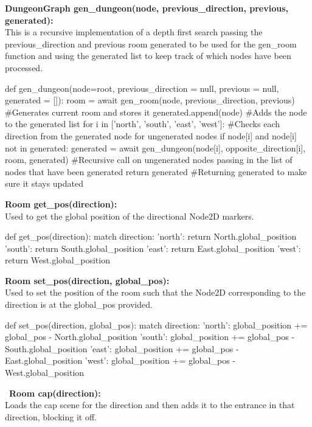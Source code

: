 \documentclass{article}
\begin{document}
        \textbf{DungeonGraph gen\_dungeon(node, previous\_direction, previous, generated):}\\
        This is a recursive implementation of a depth first search passing the previous\_direction and previous room generated to be used for the gen\_room function and using the generated list to keep track of which nodes have been processed.\\
        \begin{python}
def gen_dungeon(node=root, previous_direction = null, previous = null, generated = []):
   room = await gen_room(node, previous_direction, previous) #Generates current room and stores it
   generated.append(node) #Adds the node to the generated list
   for i in ['north', 'south', 'east', 'west']: #Checks each direction from the generated node for ungenerated nodes
      if node[i] and node[i] not in generated:
         generated = await gen_dungeon(node[i], opposite_direction[i], room, generated) #Recursive call on ungenerated nodes passing in the list of nodes that have been generated
   return generated #Returning generated to make sure it stays updated
        \end{python}
        \textbf{Room get\_pos(direction):}\\
        Used to get the global position of the directional Node2D markers.
        \begin{python}
def get_pos(direction):
   match direction:
      'north':
         return North.global_position
      'south':
         return South.global_position 
      'east':
         return East.global_position 
      'west':
         return West.global_position
        \end{python}
        \textbf{Room set\_pos(direction, global\_pos):}\\
        Used to set the position of the room such that the Node2D corresponding to the direction is at the global\_pos provided.
        \begin{python}
def set_pos(direction, global_pos):
   match direction:
      'north':
         global_position += global_pos - North.global_position
      'south':
	 global_position += global_pos - South.global_position 
      'east':
	 global_position += global_pos - East.global_position 
      'west':
	 global_position += global_pos - West.global_position 
        \end{python}\
        \textbf{Room cap(direction):}\\
        Loads the cap scene for the direction and then adds it to the entrance in that direction, blocking it off.
\end{document}
